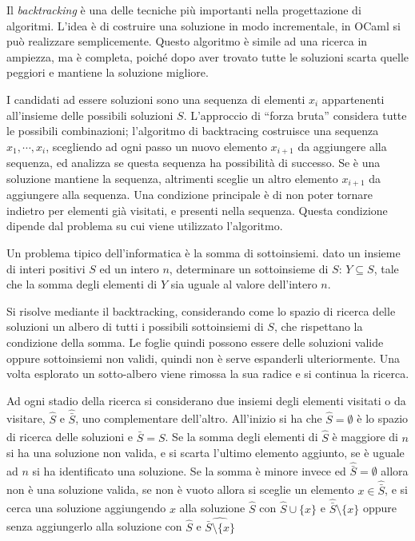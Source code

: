 \documentclass{article}
\numberwithin{equation}{subsection}
\begin{document}
Il \textit{backtracking} è una delle tecniche più importanti nella progettazione di algoritmi. L'idea è di costruire una soluzione in modo incrementale, in OCaml si può realizzare semplicemente. Questo algoritmo è simile ad una ricerca in ampiezza, ma è completa, poiché dopo aver trovato tutte le soluzioni scarta quelle peggiori e mantiene la soluzione migliore. 

I candidati ad essere soluzioni sono una sequenza di elementi $x_i$ appartenenti all'insieme delle possibili soluzioni $S$. L'approccio di ``forza bruta'' considera tutte le possibili combinazioni; l'algoritmo di backtracing costruisce una sequenza $x_1,\cdots,x_i$, scegliendo ad ogni passo un nuovo elemento $x_{i+1}$ da aggiungere alla sequenza, ed analizza se questa sequenza ha possibilità di successo. Se è una soluzione mantiene la sequenza, altrimenti sceglie un altro elemento $x_{i+1}$ da aggiungere alla sequenza. 
Una condizione principale è di non poter tornare indietro per elementi già visitati, e presenti nella sequenza. Questa condizione dipende dal problema su cui viene utilizzato l'algoritmo. 


Un problema tipico dell'informatica è la somma di sottoinsiemi. dato un insieme di interi positivi $S$ ed un intero $n$, determinare un sottoinsieme di $S$: $Y\subseteq S$, tale che la somma degli elementi di $Y$ sia uguale al valore dell'intero $n$. 

Si risolve mediante il backtracking, considerando come lo spazio di ricerca delle soluzioni un albero di tutti i possibili sottoinsiemi di $S$, che rispettano la condizione della somma. Le foglie quindi possono essere delle soluzioni valide oppure sottoinsiemi non validi, quindi non è serve espanderli ulteriormente. Una volta esplorato un sotto-albero viene rimossa la sua radice e si continua la ricerca. 


Ad ogni stadio della ricerca si considerano due insiemi degli elementi visitati o da visitare, $\hat{S}$ e $\hat{\bar{S}}$, uno complementare dell'altro. All'inizio si ha che $\hat{S}=\emptyset$ è lo spazio di ricerca delle soluzioni e $\hat{\bar{S}}=S$. 
Se la somma degli elementi di $\hat{S}$ è maggiore di $n$ si ha una soluzione non valida, e si scarta l'ultimo elemento aggiunto, se è uguale ad $n$ si ha identificato una soluzione. Se la somma è minore invece ed $\hat{\bar{S}}=\emptyset$ allora non è una soluzione valida, se non è vuoto allora si sceglie un elemento $x\in\hat{\bar{S}}$, e si cerca una soluzione aggiungendo $x$ alla soluzione $\hat{S}$ con $\hat{S}\cup\{x\}$ e $\hat{\bar{S}}\setminus\{x\}$ oppure senza aggiungerlo alla soluzione con $\hat{S}$ e $\hat{\bar{S}\setminus\{x\}}$ 
\end{document}
